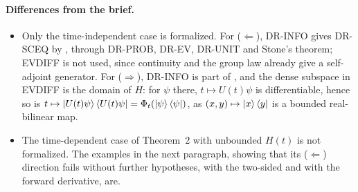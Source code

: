 \documentclass[11pt]{article}
\begin{document}
\paragraph{Differences from the brief.}
\begin{itemize}
\item Only the time-independent case is formalized. For ($\Leftarrow$), DR-INFO gives DR-SCEQ
  by , through DR-PROB, DR-EV, DR-UNIT and Stone's theorem; EVDIFF is not
  used, since continuity and the group law already give a self-adjoint generator. For
  ($\Rightarrow$), DR-INFO is part of , and the dense subspace in EVDIFF
  is the domain of $H$: for $\psi$ there, $t \mapsto U(t)\psi$ is differentiable, hence so is
  $t \mapsto \ket{U(t)\psi}\bra{U(t)\psi} = \Phi_t(\ket\psi\bra\psi)$, as
  $(x, y) \mapsto \ket{x}\bra{y}$ is a bounded real-bilinear map.
\item The time-dependent case of Theorem~2 with unbounded $H(t)$ is not formalized. The examples
  in the next paragraph, showing that its ($\Leftarrow$) direction fails without further
  hypotheses, with the two-sided and with the forward derivative, are.
\end{itemize}
\end{document}
